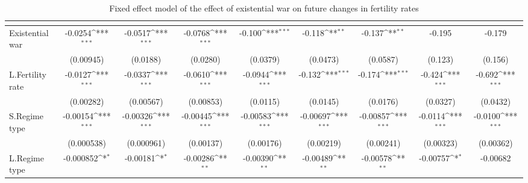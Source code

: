 \begin{table}[htbp]\centering
\def\sym#1{\ifmmode^{#1}\else\(^{#1}\)\fi}
\caption{Fixed effect model of the effect of existential war on future changes in fertility rates\label{fefertilityexistential}}
\begin{tabular}{l*{8}{c}}
\hline\hline
                    &&&&&&&&\\
\hline
Existential war     &     -0.0254\sym{***}&     -0.0517\sym{***}&     -0.0768\sym{***}&      -0.100\sym{***}&      -0.118\sym{**} &      -0.137\sym{**} &      -0.195         &      -0.179         \\
                    &   (0.00945)         &    (0.0188)         &    (0.0280)         &    (0.0379)         &    (0.0473)         &    (0.0587)         &     (0.123)         &     (0.156)         \\
[1em]
L.Fertility rate    &     -0.0127\sym{***}&     -0.0337\sym{***}&     -0.0610\sym{***}&     -0.0944\sym{***}&      -0.132\sym{***}&      -0.174\sym{***}&      -0.424\sym{***}&      -0.692\sym{***}\\
                    &   (0.00282)         &   (0.00567)         &   (0.00853)         &    (0.0115)         &    (0.0145)         &    (0.0176)         &    (0.0327)         &    (0.0432)         \\
[1em]
S.Regime type       &    -0.00154\sym{***}&    -0.00326\sym{***}&    -0.00445\sym{***}&    -0.00583\sym{***}&    -0.00697\sym{***}&    -0.00857\sym{***}&     -0.0114\sym{***}&     -0.0100\sym{***}\\
                    &  (0.000538)         &  (0.000961)         &   (0.00137)         &   (0.00176)         &   (0.00219)         &   (0.00241)         &   (0.00323)         &   (0.00362)         \\
[1em]
L.Regime type       &   -0.000852\sym{*}  &    -0.00181\sym{*}  &    -0.00286\sym{**} &    -0.00390\sym{**} &    -0.00489\sym{**} &    -0.00578\sym{**} &    -0.00757\sym{*}  &    -0.00682         \\

\end{tabular}
\end{table}
